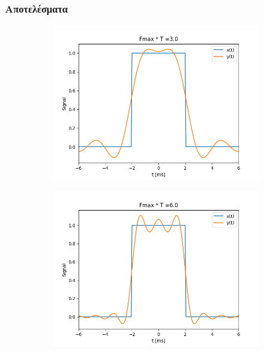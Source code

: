 \documentclass[9pt]{beamer}
\begin{document}
	\begin{frame}
		\frametitle{Αποτελέσματα}
		\begin{figure}
			\begin{subfigure}{0.49\linewidth}
				\includegraphics[width=\linewidth]{BT}
			\end{subfigure}
			\begin{subfigure}{0.49\linewidth}
				\includegraphics[width=\linewidth]{BT6}	
			\end{subfigure}		
		\end{figure}
	\end{frame}
\end{document}
